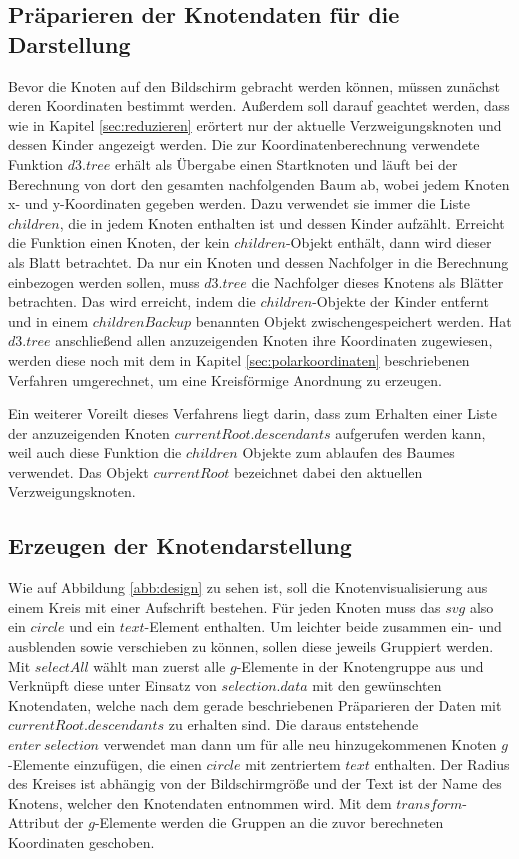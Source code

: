\subsection{Präparieren der Knotendaten für die Darstellung}\label{sec:prep}
Bevor die Knoten auf den Bildschirm gebracht werden können, müssen zunächst deren Koordinaten bestimmt werden. Außerdem soll darauf geachtet werden, dass wie in Kapitel \ref{sec:reduzieren} erörtert nur der aktuelle Verzweigungsknoten und dessen Kinder angezeigt werden. Die zur Koordinatenberechnung verwendete Funktion $d3.tree$ erhält als Übergabe einen Startknoten und läuft bei der Berechnung von dort den gesamten nachfolgenden Baum ab, wobei jedem Knoten x- und y-Koordinaten gegeben werden. Dazu verwendet sie immer die Liste $children$, die in jedem Knoten enthalten ist und dessen Kinder aufzählt. Erreicht die Funktion einen Knoten, der kein $children$-Objekt enthält, dann wird dieser als Blatt betrachtet. Da nur ein Knoten und dessen Nachfolger in die Berechnung einbezogen werden sollen, muss $d3.tree$ die Nachfolger dieses Knotens als Blätter betrachten. Das wird erreicht, indem die $children$-Objekte der Kinder entfernt und in einem $childrenBackup$ benannten Objekt zwischengespeichert werden. Hat $d3.tree$ anschließend allen anzuzeigenden Knoten ihre Koordinaten zugewiesen, werden diese noch mit dem in Kapitel \ref{sec:polarkoordinaten} beschriebenen Verfahren umgerechnet, um eine Kreisförmige Anordnung zu erzeugen.

Ein weiterer Voreilt dieses Verfahrens liegt darin, dass zum Erhalten einer Liste der anzuzeigenden Knoten $currentRoot.descendants$ aufgerufen werden kann, weil auch diese Funktion die $children$ Objekte zum ablaufen des Baumes verwendet. Das Objekt $currentRoot$ bezeichnet dabei den aktuellen Verzweigungsknoten.

\subsection{Erzeugen der Knotendarstellung}\label{sec:knoten}

Wie auf Abbildung \ref{abb:design} zu sehen ist, soll die Knotenvisualisierung aus einem Kreis mit einer Aufschrift bestehen. Für jeden Knoten muss das $svg$ also ein $circle$ und ein $text$-Element enthalten. Um leichter beide zusammen ein- und ausblenden sowie verschieben zu können, sollen diese jeweils Gruppiert werden. Mit $selectAll$ wählt man zuerst alle $g$-Elemente in der Knotengruppe aus und Verknüpft diese unter Einsatz von $selection.data$ mit den gewünschten Knotendaten, welche nach dem gerade beschriebenen Präparieren der Daten mit $currentRoot.descendants$ zu erhalten sind. Die daraus entstehende $enter\ selection$ verwendet man dann um für alle neu hinzugekommenen Knoten $g$-Elemente einzufügen, die einen $circle$ mit zentriertem $text$ enthalten. Der Radius des Kreises ist abhängig von der Bildschirmgröße und der Text ist der Name des Knotens, welcher den Knotendaten entnommen wird. Mit dem $transform$-Attribut der $g$-Elemente werden die Gruppen an die zuvor berechneten Koordinaten geschoben.

